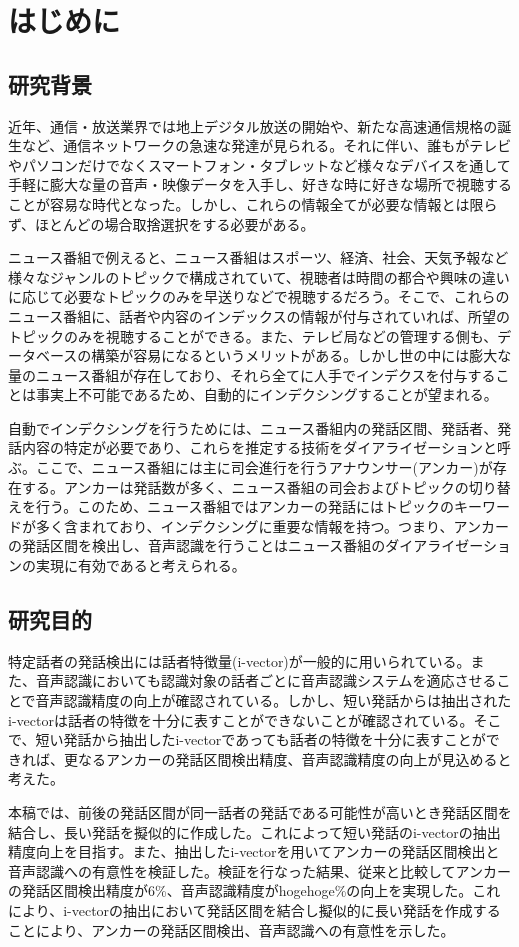 \chapter{はじめに}

\section{研究背景}
近年、通信・放送業界では地上デジタル放送の開始や、新たな高速通信規格の誕生など、通信ネットワークの急速な発達が見られる。それに伴い、誰もがテレビやパソコンだけでなくスマートフォン・タブレットなど様々なデバイスを通して手軽に膨大な量の音声・映像データを入手し、好きな時に好きな場所で視聴することが容易な時代となった。しかし、これらの情報全てが必要な情報とは限らず、ほとんどの場合取捨選択をする必要がある。\par
ニュース番組で例えると、ニュース番組はスポーツ、経済、社会、天気予報など様々なジャンルのトピックで構成されていて、視聴者は時間の都合や興味の違いに応じて必要なトピックのみを早送りなどで視聴するだろう。そこで、これらのニュース番組に、話者や内容のインデックスの情報が付与されていれば、所望のトピックのみを視聴することができる。また、テレビ局などの管理する側も、データベースの構築が容易になるというメリットがある。しかし世の中には膨大な量のニュース番組が存在しており、それら全てに人手でインデクスを付与することは事実上不可能であるため、自動的にインデクシングすることが望まれる。\par
自動でインデクシングを行うためには、ニュース番組内の発話区間、発話者、発話内容の特定が必要であり、これらを推定する技術をダイアライゼーションと呼ぶ。ここで、ニュース番組には主に司会進行を行うアナウンサー(アンカー)が存在する。アンカーは発話数が多く、ニュース番組の司会およびトピックの切り替えを行う。このため、ニュース番組ではアンカーの発話にはトピックのキーワードが多く含まれており、インデクシングに重要な情報を持つ。つまり、アンカーの発話区間を検出し、音声認識を行うことはニュース番組のダイアライゼーションの実現に有効であると考えられる。

\section{研究目的}
特定話者の発話検出には話者特徴量(i-vector)が一般的に用いられている。また、音声認識においても認識対象の話者ごとに音声認識システムを適応させることで音声認識精度の向上が確認されている。しかし、短い発話からは抽出されたi-vectorは話者の特徴を十分に表すことができない\cite{panaiv}ことが確認されている。そこで、短い発話から抽出したi-vectorであっても話者の特徴を十分に表すことができれば、更なるアンカーの発話区間検出精度、音声認識精度の向上が見込めると考えた。\par
本稿では、前後の発話区間が同一話者の発話である可能性が高いとき発話区間を結合し、長い発話を擬似的に作成した。これによって短い発話のi-vectorの抽出精度向上を目指す。また、抽出したi-vectorを用いてアンカーの発話区間検出と音声認識への有意性を検証した。検証を行なった結果、従来と比較してアンカーの発話区間検出精度が6\%、音声認識精度がhogehoge\%の向上を実現した。これにより、i-vectorの抽出において発話区間を結合し擬似的に長い発話を作成することにより、アンカーの発話区間検出、音声認識への有意性を示した。

